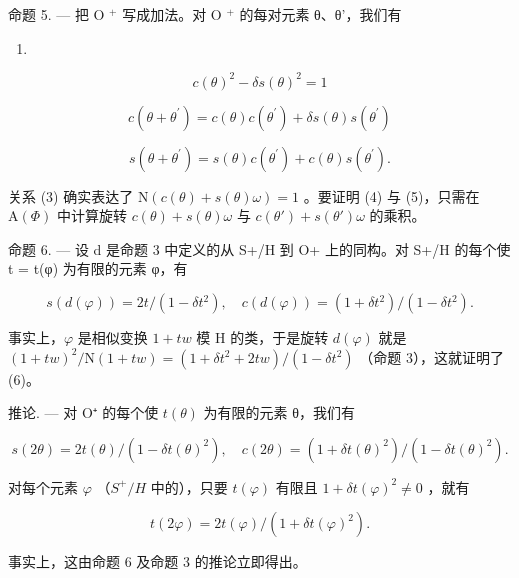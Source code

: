 命题 5. --- 把 O \(^{+}\) 写成加法。对 O \(^{+}\) 的每对元素 θ、θ'，我们有

\begin{enumerate}
\def\labelenumi{(\arabic{enumi})}
\setcounter{enumi}{2}
\tightlist
\item
\end{enumerate}

\[
c (\theta) ^ {2} - \delta s (\theta) ^ {2} = 1\tag{4}
\]

\[
c (\theta + \theta^ {\prime}) = c (\theta) c (\theta^ {\prime}) + \delta s (\theta) s (\theta^ {\prime})\tag{5}
\]

\[
s (\theta + \theta^ {\prime}) = s (\theta) c (\theta^ {\prime}) + c (\theta) s (\theta^ {\prime}).
\]

关系 (3) 确实表达了 \(\mathrm{N}(c(\theta)+s(\theta)\omega)=1\) 。要证明 (4) 与 (5)，只需在 \(\mathrm{A}(\Phi)\) 中计算旋转 \(c(\theta)+s(\theta)\omega\) 与 \(c(\theta')+s(\theta')\omega\) 的乘积。

命题 6. — 设 d 是命题 3 中定义的从 S+/H 到 O+ 上的同构。对 S+/H 的每个使 t = t(φ) 为有限的元素 φ，有

\[
s (d (\varphi)) = 2 t / (1 - \delta t ^ {2}), \quad c (d (\varphi)) = (1 + \delta t ^ {2}) / (1 - \delta t ^ {2}).\tag{6}
\]

事实上，\(\varphi\) 是相似变换 \(1 + tw\) 模 H 的类，于是旋转 \(d(\varphi)\) 就是 \((1 + tw)^2/\mathrm{N}(1 + tw) = (1 + \delta t^2 + 2tw)/(1 - \delta t^2)\) （命题 3），这就证明了 (6)。

推论. --- 对 O⁺ 的每个使 \(t(\theta)\) 为有限的元素 θ，我们有

\[
s (2 \theta) = 2 t (\theta) / (1 - \delta t (\theta) ^ {2}), \quad c (2 \theta) = (1 + \delta t (\theta) ^ {2}) / (1 - \delta t (\theta) ^ {2}). \tag {7}
\]

对每个元素 \(\varphi\) （\(S^{+}/H\) 中的），只要 \(t(\varphi)\) 有限且 \(1 + \delta t(\varphi)^{2} \neq 0\) ，就有

\[
t (2 \varphi) = 2 t (\varphi) / (1 + \delta t (\varphi) ^ {2}).\tag{8}
\]

事实上，这由命题 6 及命题 3 的推论立即得出。

